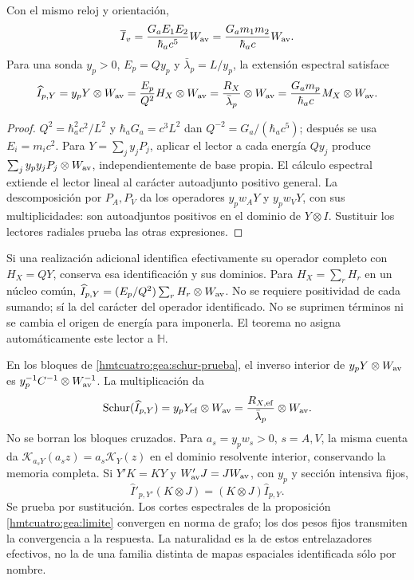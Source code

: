 \begin{theorem}
\label{hmtcuatro:gea:autoinercial-radial}
Con el mismo reloj y orientación,
\begin{equation}
\overline I_v=\frac{G_aE_1E_2}{\hbar_ac^5}W_{\rm av}
=\frac{G_am_1m_2}{\hbar_ac}W_{\rm av}.
\label{hmtcuatro:gea:mach-gravedad}
\end{equation}
Para una sonda $y_p>0$, $E_p=Qy_p$ y
$\bar\lambda_p=L/y_p$, la extensión espectral satisface
\begin{equation}
\widehat I_{p,Y}=y_pY\otimes W_{\rm av}
=\frac{E_p}{Q^2}H_X\otimes W_{\rm av}
=\frac{R_X}{\bar\lambda_p}\otimes W_{\rm av}
=\frac{G_am_p}{\hbar_ac}M_X\otimes W_{\rm av}.
\label{hmtcuatro:gea:identidad-autoinercial}
\end{equation}
\end{theorem}
\begin{proof}
$Q^2=\hbar_a^2c^2/L^2$ y $\hbar_aG_a=c^3L^2$ dan
$Q^{-2}=G_a/(\hbar_ac^5)$; después se usa $E_i=m_ic^2$.
Para $Y=\sum_jy_jP_j$, aplicar el lector a cada energía $Qy_j$
produce $\sum_jy_py_jP_j\otimes W_{\rm av}$, independientemente
de base propia. El cálculo espectral extiende el lector lineal
al carácter autoadjunto positivo general.
La descomposición por $P_A,P_V$ da los operadores
$y_pw_AY$ y $y_pw_VY$, con sus multiplicidades:
son autoadjuntos positivos en el dominio de $Y\otimes I$.
Sustituir los lectores radiales prueba las otras expresiones.
\end{proof}

Si una realización adicional identifica efectivamente su operador
completo con $H_X=QY$, conserva esa identificación y sus dominios.
Para $H_X=\sum_rH_r$ en un núcleo común,
$\widehat I_{p,Y}=(E_p/Q^2)\sum_rH_r\otimes W_{\rm av}$.
No se requiere positividad de cada sumando; sí la del carácter
del operador identificado. No se suprimen términos ni se cambia
el origen de energía para imponerla.
El teorema no asigna automáticamente este lector a $\mathbb H$.

En los bloques de \eqref{hmtcuatro:gea:schur-prueba}, el inverso
interior de $y_pY\otimes W_{\rm av}$ es
$y_p^{-1}C^{-1}\otimes W_{\rm av}^{-1}$.
La multiplicación da
\begin{equation}
\operatorname{Schur}(\widehat I_{p,Y})
=y_pY_{\rm ef}\otimes W_{\rm av}
=\frac{R_{X,\rm ef}}{\bar\lambda_p}\otimes W_{\rm av}.
\label{hmtcuatro:gea:schur-autoinercia}
\end{equation}
No se borran los bloques cruzados.
Para $a_s=y_pw_s>0$, $s=A,V$, la misma cuenta da
$\mathcal K_{a_sY}(a_sz)=a_s\mathcal K_Y(z)$
en el dominio resolvente interior, conservando la memoria completa.
Si $Y'K=KY$ y $W'_{\rm av}J=JW_{\rm av}$, con
$y_p$ y sección intensiva fijos,
\begin{equation}
\widehat I'_{p,Y'}(K\otimes J)
=(K\otimes J)\widehat I_{p,Y}.
\label{hmtcuatro:gea:naturalidad}
\end{equation}
Se prueba por sustitución.
Los cortes espectrales de la proposición
\ref{hmtcuatro:gea:limite} convergen en norma de grafo;
los dos pesos fijos transmiten la convergencia a la respuesta.
La naturalidad es la de estos entrelazadores efectivos, no la
de una familia distinta de mapas espaciales identificada sólo por nombre.

